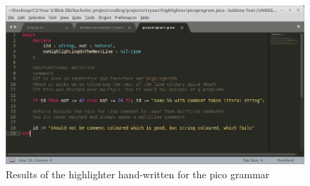 \pagebreak
\begin{figure}[h!]
	\centering
	\includegraphics[width=\textwidth, keepaspectratio]{Figures/highlightShots/pico_handwritten.png}
	\decoRule
 	\caption[Hand-written highlighter results for Pico grammar]{Results of the highlighter hand-written for the pico grammar}
\end{figure}

